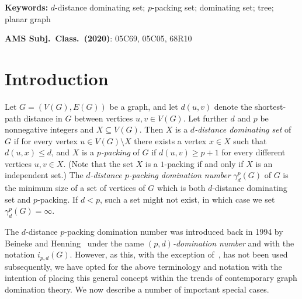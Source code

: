 \documentclass[12pt]{article}
\begin{document}
\noindent
{\bf Keywords:} $d$-distance dominating set; $p$-packing set; dominating set; tree; planar graph

\medskip\noindent
{\bf AMS Subj.\ Class.\ (2020)}: 05C69, 05C05, 68R10

\section{Introduction}
\label{sec:intro}

Let $G = (V(G), E(G))$ be a graph, and let $d(u,v)$ denote the shortest-path distance in $G$ between vertices $u, v\in V(G)$. Let further $d$ and $p$ be nonnegative integers and $X\subseteq V(G)$. Then $X$ is a {\em $d$-distance dominating set} of $G$ if for every vertex $u\in V(G)\setminus X$ there exists a vertex $x\in X$ such that $d(u,x) \le d$, and $X$ is a {\em $p$-packing} of $G$ if $d(u,v) \ge p+1$ for every different vertices $u,v\in X$. (Note that the set $X$ is a $1$-packing if and only if $X$ is an independent set.) The \emph{ $d$-distance $p$-packing domination number} $\gamma_d^p(G)$ of $G$ is the minimum size of a set of vertices of $G$ which is both $d$-distance dominating set and $p$-packing. If $d <p$, such a set might not exist, in which case we set $\gamma_d^p(G) = \infty$. 

The $d$-distance $p$-packing domination number was introduced back in 1994 by Beineke and Henning~\cite{Beineke-1994} under the name {\em $(p,d)$-domination number} and with the notation $i_{p,d}(G)$. However, as this, with the exception of~\cite{Gimbel-1996}, has not been used subsequently, we have opted for the above terminology and notation with the intention of placing this general concept within the trends of contemporary graph domination theory. We now describe a number of important special cases.
\end{document}

